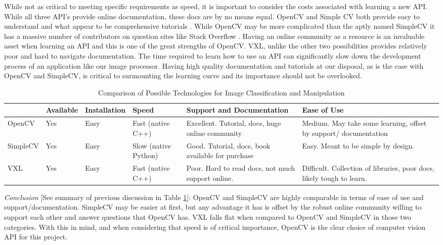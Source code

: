 \documentclass[10pt, onecolumn, draftclsnofoot, letterpaper, compsoc]{IEEEtran}
\begin{document}
While not as critical to meeting specific requirements as speed, it is important
to consider the costs associated with learning a new API. While all three API's
provide online documentation, these docs are by no means equal. OpenCV and
Simple CV both provide easy to understand and what appear to be comprehensive
tutorials \cite{OCV, SCV}. While OpenCV may be more complicated than the aptly
named SimpleCV it has a massive number of contributors on question sites like
Stack Overflow \cite{stkovrflw}. Having an online community as a resource is an
invaluable asset when learning an API and this is one of the great strengths of
OpenCV. VXL, unlike the other two possibilities provides relatively poor and
hard to navigate documentation. The time required to learn how to use an API can
significantly slow down the development process of an application like our image
processor. Having high quality documentation and tutorials at our disposal, as
is the case with OpenCV and SimpleCV, is critical to surmounting the learning
curve and its importance should not be overlooked. \\

\begin{table}[h]
\centering
\caption{Comparison of Possible Technologies for Image Classification and Manipulation}
\begin{tabular}{|p{2.1cm}|p{2.1cm}|p{2.1cm}|p{2.1cm}|p{2.1cm}|p{2.1cm}|}
\cline{4-4}

\hline  & Available & Installation & Speed & Support and Documentation & Ease of
Use  \\ \hline

OpenCV  & Yes & Easy & Fast (native C++) &  Excellent. Tutorial, docs, huge
online community & Medium. May take some learning, offset by support/
documentation  \\ \hline

SimpleCV & Yes & Easy & Slow (native Python) & Good. Tutorial, docs, book
available for purchase & Easy. Meant to be simple by design.  \\ \hline

VXL & Yes & Easy & Fast (native C++) & Poor. Hard to read docs, not much support
online. & Difficult. Collection of libraries, poor docs, likely tough to learn.
\\ \hline

\end{tabular}
\label{table:george1}
\end{table}

\textit{Conclusion} [See summary of previous discussion in Table
\ref{table:george1}]: OpenCV and SimpleCV are highly comparable in terms of ease
of use and support/documentation. SimpleCV may be easier at first, but any
advantage it has is offset by the robust online community willing to support
each other and answer questions that OpenCV has. VXL falls flat when compared to
OpenCV and SimpleCV in those two categories. With this in mind, and when
considering that speed is of critical importance, OpenCV is the clear choice of
computer vision API for this project. \\
\end{document}
